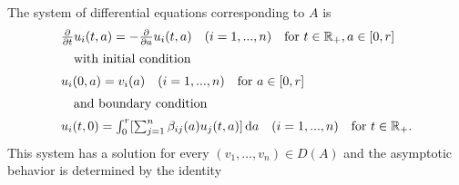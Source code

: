 \begin{example}
The system of differential equations corresponding to $A$ is
\begin{equation} \label{eq:c4-3.13}
\begin{array}{l}
\frac{\partial}{\partial t}u_i(t,a) = - \frac{\partial}{\partial a}u_i(t,a) \quad (i=1,...,n) \quad \text{for } t\in\mathbb{R}_+, a\in[0,r]\\[2mm]
\quad \text{with initial condition} \\[2mm]
u_i(0,a) = v_i(a) \quad (i=1,...,n) \quad \text{for } a\in[0,r] \\[2mm]
\quad \text{and boundary condition} \\[2mm]
u_i(t,0) = \int_0^r [\sum_{j=1}^n \beta_{ij}(a)u_j(t,a)]\mathop{}\!\mathrm{d}{a} \quad (i=1,...,n) \quad \text{for } t\in\mathbb{R}_+.
\end{array}
\end{equation}
This system has a solution for every $(v_{1}, \ldots, v_{n}) \in D(A)$ and the asymptotic behavior is determined by the identity

\end{example}
